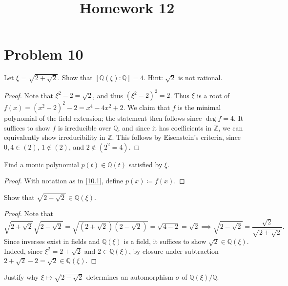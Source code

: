 \documentclass[11pt, letterpaper]{article}
\title{Homework 12}
\begin{document}
\makeproblem
\section{Problem 10}
\setcounter{section}{10}
\begin{problem}\label{10.1}
	Let $\xi =\sqrt{2+\sqrt{2} } $. Show that $[\mathbb{Q} (\xi ) : \mathbb{Q} ]=4$. Hint: $\sqrt{2} $ is not rational.
\end{problem}
\begin{proof}
	Note that $\xi ^2 - 2 = \sqrt{2} $, and thus $\left( \xi ^2 - 2 \right) ^2=2$. Thus $\xi $ is a root of $f(x) = (x^2-2)^2 -2= x^4 - 4x^2 + 2$. We claim that $f$ is the minimal polynomial of the field extension; the statement then follows since $\operatorname{deg} f=4$. It suffices to show $f$ is irreducible over $\mathbb{Q} $, and since it has coefficients in $\mathbb{Z} $, we can equivalently show irreducibility in $\mathbb{Z} $. This follows by Eisenstein's criteria, since $0,4\in (2)$, $1\notin (2)$, and $2\notin (2^2=4)$.
\end{proof}
\begin{problem}\label{10.2}
	Find a monic polynomial $p(t)\in \mathbb{Q} (t)$ satisfied by $\xi $.
\end{problem}
\begin{proof}
	With notation as in \cref{10.1}, define $p(x)\coloneqq f(x)$.
\end{proof}
\begin{problem}\label{10.3}
	Show that $\sqrt{2-\sqrt{2} } \in\mathbb{Q} (\xi )$.
\end{problem}
\begin{proof}
	Note that
	\[
		\sqrt{2+\sqrt{2} } \sqrt{2-\sqrt{2} } =\sqrt{\left( 2+\sqrt{2}  \right) \left( 2-\sqrt{2}  \right) } =\sqrt{4-2} =\sqrt{2} \implies \sqrt{2-\sqrt{2} } =\frac{\sqrt{2} }{\sqrt{2+\sqrt{2} } } 
	.\]
	Since inverses exist in fields and $\mathbb{Q} (\xi )$ is a field, it suffices to show $\sqrt{2} \in \mathbb{Q} (\xi )$. Indeed, since $\xi ^2=2+\sqrt{2} $ and $2\in \mathbb{Q} (\xi )$,  by closure under subtraction $2+\sqrt{2} -2=\sqrt{2} \in\mathbb{Q} (\xi )$.
\end{proof}
\begin{problem}\label{10.4}
	Justify why $\xi \mapsto \sqrt{2-\sqrt{2} } $ determines an automorphism $\sigma $ of $\mathbb{Q} (\xi ) /\mathbb{Q} $.
\end{problem}
\end{document}
